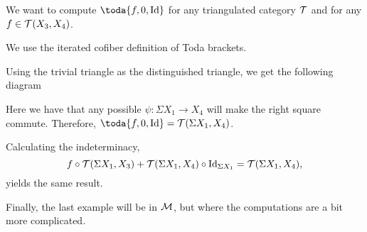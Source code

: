 \begin{example}
	\label{ex:toda_bracket_3}
	We want to compute \( \toda{f, 0, \Id} \) for any triangulated category \( {\mathcal{T}} \) and for any \( f \in {\mathcal{T}}(X_3, X_4) \).

	We use the iterated cofiber definition of Toda brackets.

	Using the trivial triangle as the distinguished triangle, we get the following diagram
	\begin{center}
	\end{center}

	Here we have that any possible \( \psi: \Sigma X_1 \to X_4 \) will make the right square commute. Therefore, \( \toda{f, 0, \Id} = \Tc(\Sigma X_1, X_4) \).

	Calculating the indeterminacy,
	\[
		f \circ {\mathcal{T}}(\Sigma X_1, X_3) + {\mathcal{T}}(\Sigma X_1, X_4) \circ \operatorname{Id}_{\Sigma X_1} = {\mathcal{T}}(\Sigma X_1, X_4),
	\]
	yields the same result.
\end{example}

Finally, the last example will be in \( {\mathcal{M}} \), but where the computations are a bit more complicated.


